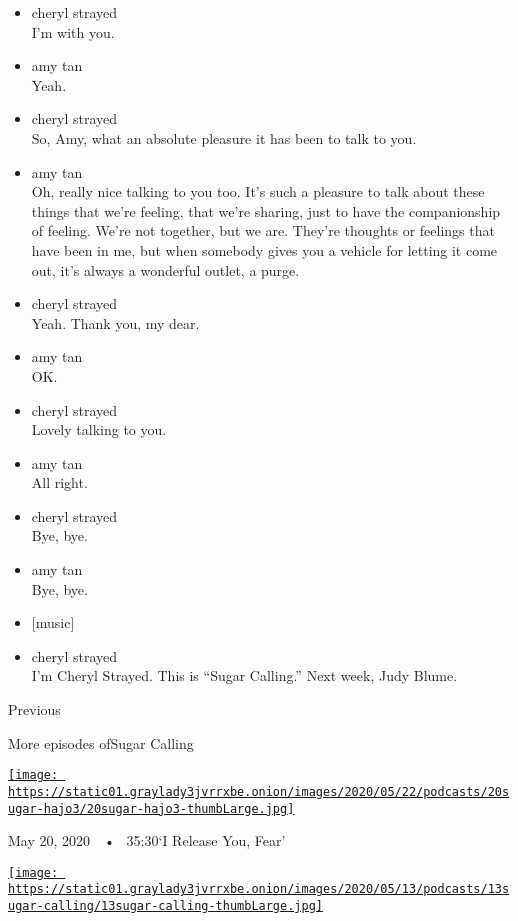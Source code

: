 \begin{itemize}
\item
  cheryl strayed\\
  I'm with you.
\item
  amy tan\\
  Yeah.
\item
  cheryl strayed\\
  So, Amy, what an absolute pleasure it has been to talk to you.
\item
  amy tan\\
  Oh, really nice talking to you too. It's such a pleasure to talk about
  these things that we're feeling, that we're sharing, just to have the
  companionship of feeling. We're not together, but we are. They're
  thoughts or feelings that have been in me, but when somebody gives you
  a vehicle for letting it come out, it's always a wonderful outlet, a
  purge.
\item
  cheryl strayed\\
  Yeah. Thank you, my dear.
\item
  amy tan\\
  OK.
\item
  cheryl strayed\\
  Lovely talking to you.
\item
  amy tan\\
  All right.
\item
  cheryl strayed\\
  Bye, bye.
\item
  amy tan\\
  Bye, bye.
\item
  {[}music{]}
\item
  cheryl strayed\\
  I'm Cheryl Strayed. This is ``Sugar Calling.'' Next week, Judy Blume.
\end{itemize}

Previous

More episodes ofSugar Calling

\href{https://www.nytimes3xbfgragh.onion/2020/05/20/podcasts/sugar-calling-joy-harjo-poetry-virus.html?action=click\&module=audio-series-bar\&region=header\&pgtype=Article}{\texttt{[image: https://static01.graylady3jvrrxbe.onion/images/2020/05/22/podcasts/20sugar-hajo3/20sugar-hajo3-thumbLarge.jpg]}}

May 20, 2020~~•~ 35:30`I Release You, Fear'

\href{https://www.nytimes3xbfgragh.onion/2020/05/13/podcasts/sugar-calling-billy-collins-poetry-virus.html?action=click\&module=audio-series-bar\&region=header\&pgtype=Article}{\texttt{[image: https://static01.graylady3jvrrxbe.onion/images/2020/05/13/podcasts/13sugar-calling/13sugar-calling-thumbLarge.jpg]}}

